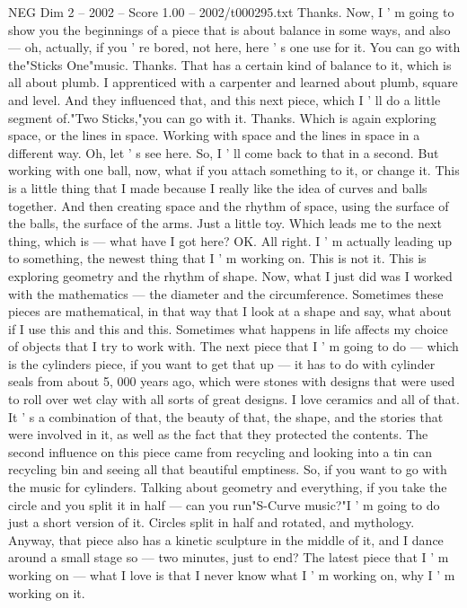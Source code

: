 \begin{textsample}{NEG Dim 2 – 2002 – Score 1.00 – 2002/t000295.txt}
Thanks.
Now, I ' m going to show you the beginnings of a piece that is about balance in some ways, and also — oh, actually, if you ' re bored, not here, here ' s one use for it.
You can go with the"Sticks One"music.
Thanks.
That has a certain kind of balance to it, which is all about plumb.
I apprenticed with a carpenter and learned about plumb, square and level.
And they influenced that, and this next piece, which I ' ll do a little segment of."Two Sticks,"you can go with it.
Thanks.
Which is again exploring space, or the lines in space.
Working with space and the lines in space in a different way.
Oh, let ' s see here.
So, I ' ll come back to that in a second.
But working with one ball, now, what if you attach something to it, or change it.
This is a little thing that I made because I really like the idea of curves and balls together.
And then creating space and the rhythm of space, using the surface of the balls, the surface of the arms.
Just a little toy.
Which leads me to the next thing, which is — what have I got here?
OK.
All right.
I ' m actually leading up to something, the newest thing that I ' m working on.
This is not it.
This is exploring geometry and the rhythm of shape.
Now, what I just did was I worked with the mathematics — the diameter and the circumference.
Sometimes these pieces are mathematical, in that way that I look at a shape and say, what about if I use this and this and this.
Sometimes what happens in life affects my choice of objects that I try to work with.
The next piece that I ' m going to do — which is the cylinders piece, if you want to get that up — it has to do with cylinder seals from about 5, 000 years ago, which were stones with designs that were used to roll over wet clay with all sorts of great designs.
I love ceramics and all of that.
It ' s a combination of that, the beauty of that, the shape, and the stories that were involved in it, as well as the fact that they protected the contents.
The second influence on this piece came from recycling and looking into a tin can recycling bin and seeing all that beautiful emptiness.
So, if you want to go with the music for cylinders.
Talking about geometry and everything, if you take the circle and you split it in half — can you run"S-Curve music?"I ' m going to do just a short version of it.
Circles split in half and rotated, and mythology.
Anyway, that piece also has a kinetic sculpture in the middle of it, and I dance around a small stage so — two minutes, just to end?
The latest piece that I ' m working on — what I love is that I never know what I ' m working on, why I ' m working on it.

\end{textsample}
